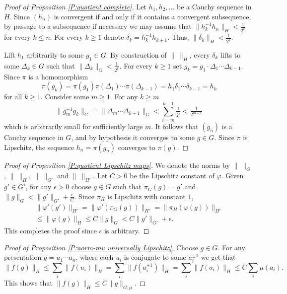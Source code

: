 \documentclass[12pt]{amsart}
\theoremstyle{definition}
\begin{document}
\begin{proof}[Proof of Proposition \ref{P:quotient complete}]
Let $h_1,h_2,\dots$ be a Cauchy sequence in $H$.
Since $(h_n)$ is convergent if and only if  it contains a convergent subsequence, by passage to a subsequence if necessary we may assume that $\|h_k^{-1}h_n\|_H < \tfrac{1}{2^k}$ for every $k \leq n$.
For every $k \geq 1$ denote $\delta_k=h_k^{-1}h_{k+1}$.
Thus, $\|\delta_k\|_H < \tfrac{1}{2^k}$.

Lift $h_1$ arbitrarily to some $g_1 \in G$.
By construction of $\| \ \|_H$, every $\delta_k$ lifts to some $\Delta_k \in G$ such that $\|\Delta_k\|_G < \tfrac{1}{2^k}$.
For every $k \geq 1$ set $g_k=g_1 \cdot \Delta_1 \cdots \Delta_{k-1}$.
Since $\pi$ is a homomorphism 
\[
\pi(g_k)=\pi(g_1) \pi(\Delta_1) \cdots \pi(\Delta_{k-1}) = h_1 \delta_1 \cdots \delta_{k-1} = h_k
\]
for all $k \geq 1$.
Consider some $m \geq 1$.
For any $k \geq m$
\[
\| g_m^{-1}g_k\|_G = \|\Delta_m \cdots \Delta_{k-1}\|_G < \sum_{i=m}^{k-1} \tfrac{1}{2^i} < \tfrac{1}{2^{m-1}} %
\]
which is arbitrarily small for sufficiently large $m$.
It follows that $(g_n)$ is a Cauchy sequence in $G$, and by hypothesis it converges to some $g \in G$.
Since $\pi$ is Lipschitz, the sequence $h_n=\pi(g_n)$ converges to $\pi(g)$.
\end{proof}






\begin{proof}[Proof of Proposition \ref{P:quotient Lipschitz maps}]
We denote the norms by $\| \ \|_G$, $\| \ \|_H$, $\| \ \|_{G'}$ and $\| \ \|_{H'}$. 
Let $C>0$ be the Lipschitz constant of $\varphi$.
Given $g' \in G'$, for any $\epsilon>0$ choose $g \in G$ such that $\pi_G(g)=g'$ and $\|g\|_G<\|g'\|_{G'}+\tfrac{\epsilon}{C}$.
Since $\pi_H$ is Lipschitz with constant $1$,
\begin{multline*}
\| \varphi'(g')\|_{H'} = \| \varphi'(\pi_G(g)) \|_{H'} = \| \pi_H(\varphi(g))\|_{H'} 
 \\
\leq 
\| \varphi(g)\|_H \leq C \| g\|_G < C\|g'\|_{G'}+\epsilon.
\end{multline*}
This completes the proof since $\epsilon$ is arbitrary.
\end{proof}






\begin{proof}[Proof of Proposition \ref{P:norm-mu universally Lipschitz}]
Choose $g \in G$.
For any presentation $g=u_1\cdots u_n$, where each $u_i$ is conjugate to some $a_i^{\pm 1}$ we get that
\[
\|f(g)\|_H \leq \sum_i \|f(u_i)\|_H = \sum_i \|f(a_i^{\pm 1})\|_H  %
= \sum_i \|f(a_i)\|_H \leq C \sum_i \mu(a_i).
\]
This shows that $\|f(g)\|_H \leq C\|g\|_{G;\mu}$.
\end{proof}
\end{document}
